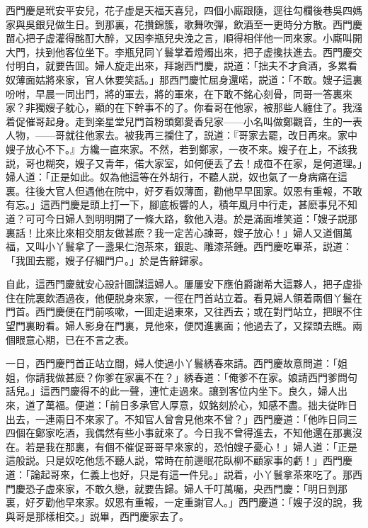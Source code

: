 西門慶是玳安平安兒，花子虚是天福天喜兒，四個小廝跟隨，逕往勾欄後巷吳四媽家與吳銀兒做生日。到那裏，花攢錦簇，歌舞吹彈，飲酒至一更時分方散。西門慶㽞心把子虚灌得酩酊大醉，又因李瓶兒央浼之言，順得相伴他一同來家。小廝叫開大門，扶到他客位坐下。李瓶兒同丫鬟掌着燈燭出來，把子虚攙扶進去。西門慶交付明白，就要告囬。婦人旋走出來，拜謝西門慶，説道：「拙夫不才貪酒，多累看奴薄面姑將來家，官人休要笑話。」那西門慶忙屈身還喏，説道：「不敢。嫂子這裏吩咐，早晨一同出門，將的軍去，將的軍來，在下敢不銘心刻骨，同哥一答裏來家？非獨嫂子躭心，顯的在下幹事不的了。你看哥在他家，被那些人纏住了。我漒着促催哥起身。走到楽星堂兒門首粉頭鄭愛香兒家——小名叫做鄭觀音，生的一表人物，——哥就往他家去。被我再三攔住了，説道：『哥家去罷，改日再來。家中嫂子放心不下。』方纔一直來家。不然，若到鄭家，一夜不來。嫂子在上，不該我説，哥也糊突，嫂子又青年，偌大家室，如何便丢了去！成亱不在家，是何道理。」婦人道：「正是如此。奴為他這等在外胡行，不聽人説，奴也氣了一身病痛在這裏。往後大官人但遇他在院中，好歹看奴薄面，勸他早早囬家。奴恩有重報，不敢有忘。」這西門慶是頭上打一下，腳底板響的人，積年風月中行走，甚麽事兒不知道？可可今日婦人到明明開了一條大路，敎他入港。於是滿面堆笑道：「嫂子説那裏話！比來比來相交朋友做甚麽？我一定苦心諫哥，嫂子放心！」婦人又道個萬福，又叫小丫鬟拿了一盞果仁泡茶來，銀匙、雕漆茶鍾。西門慶吃畢茶，説道：「我囬去罷，嫂子仔細門户。」於是告辭歸家。

自此，這西門慶就安心設計圖謀這婦人。屢屢安下應伯爵謝希大這夥人，把子虚掛住在院裏飲酒過夜，他便脱身來家，一徑在門首站立着。看見婦人領着兩個丫鬟在門首。西門慶便在門前咳嗽，一囬走過東來，又往西去；或在對門站立，把眼不住望門裏盼看。婦人影身在門裏，見他來，便閃進裏面；他過去了，又探頭去瞧。兩個眼意心期，已在不言之表。

一日，西門慶門首正站立間，婦人使過小丫鬟綉春來請。西門慶故意問道：「姐姐，你請我做甚麽？你爹在家裏不在？」綉春道：「俺爹不在家。娘請西門爹問句話兒。」這西門慶得不的此一聲，連忙走過來。讓到客位内坐下。良久，婦人出來，道了萬福。便道：「前日多承官人厚意，奴銘刻於心，知感不盡。拙夫従昨日出去，一連兩日不來家了。不知官人曾會見他來不曾？」西門慶道：「他昨日同三四個在鄭家吃酒，我偶然有些小事就來了。今日我不曾得進去，不知他還在那裏沒在。若是我在那裏，有個不催促哥哥早來家的，恐怕嫂子憂心！」婦人道：「正是這般説。只是奴吃他恁不聽人説，常時在前邊眠花臥柳不顧家事的虧！」西門慶道：「論起哥來，仁義上也好，只是有這一件兒。」説着，小丫鬟拿茶來吃了。那西門慶恐子虚來家，不敢久戀，就要告歸。婦人千叮萬囑，央西門慶：「明日到那裏，好歹勸他早來家。奴恩有重報，一定重謝官人。」西門慶道：「嫂子沒的說，我與哥是那樣相交。」説畢，西門慶家去了。

